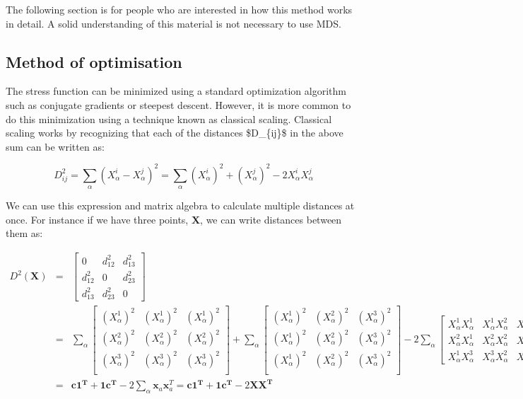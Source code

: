 The following section is for people who are interested in how this method works in detail. A solid understanding of this material is not necessary to use M\+D\+S.\hypertarget{_c_l_a_s_s_i_c_a_l__m_d_s_dim-sec}{}\subsection{Method of optimisation}\label{_c_l_a_s_s_i_c_a_l__m_d_s_dim-sec}
The stress function can be minimized using a standard optimization algorithm such as conjugate gradients or steepest descent. However, it is more common to do this minimization using a technique known as classical scaling. Classical scaling works by recognizing that each of the distances \$\+D\+\_\+\{ij\}\$ in the above sum can be written as\+:

\[ D_{ij}^2 = \sum_{\alpha} (X^i_\alpha - X^j_\alpha)^2 = \sum_\alpha (X^i_\alpha)^2 + (X^j_\alpha)^2 - 2X^i_\alpha X^j_\alpha \]

We can use this expression and matrix algebra to calculate multiple distances at once. For instance if we have three points, $\mathbf{X}$, we can write distances between them as\+:

\begin{eqnarray*} D^2(\mathbf{X}) &=& \left[ \begin{array}{ccc} 0 & d_{12}^2 & d_{13}^2 \\ d_{12}^2 & 0 & d_{23}^2 \\ d_{13}^2 & d_{23}^2 & 0 \end{array}\right] \\ &=& \sum_\alpha \left[ \begin{array}{ccc} (X^1_\alpha)^2 & (X^1_\alpha)^2 & (X^1_\alpha)^2 \\ (X^2_\alpha)^2 & (X^2_\alpha)^2 & (X^2_\alpha)^2 \\ (X^3_\alpha)^2 & (X^3_\alpha)^2 & (X^3_\alpha)^2 \\ \end{array}\right] + \sum_\alpha \left[ \begin{array}{ccc} (X^1_\alpha)^2 & (X^2_\alpha)^2 & (X^3_\alpha)^2 \\ (X^1_\alpha)^2 & (X^2_\alpha)^2 & (X^3_\alpha)^2 \\ (X^1_\alpha)^2 & (X^2_\alpha)^2 & (X^3_\alpha)^2 \\ \end{array}\right] - 2 \sum_\alpha \left[ \begin{array}{ccc} X^1_\alpha X^1_\alpha & X^1_\alpha X^2_\alpha & X^1_\alpha X^3_\alpha \\ X^2_\alpha X^1_\alpha & X^2_\alpha X^2_\alpha & X^2_\alpha X^3_\alpha \\ X^1_\alpha X^3_\alpha & X^3_\alpha X^2_\alpha & X^3_\alpha X^3_\alpha \end{array}\right] \nonumber \\ &=& \mathbf{c 1^T} + \mathbf{1 c^T} - 2 \sum_\alpha \mathbf{x}_a \mathbf{x}^T_a = \mathbf{c 1^T} + \mathbf{1 c^T} - 2\mathbf{X X^T} \end{eqnarray*}

